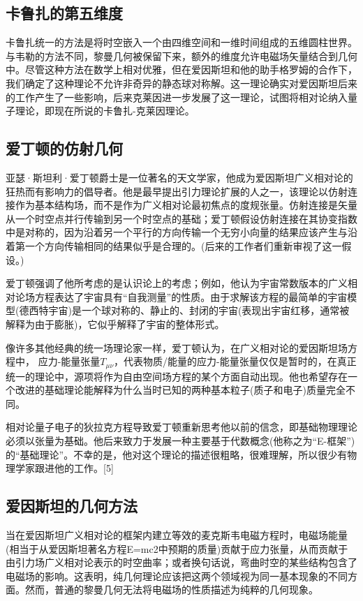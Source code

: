 \subsection{卡鲁扎的第五维度}

卡鲁扎统一的方法是将时空嵌入一个由四维空间和一维时间组成的五维圆柱世界。与韦勒的方法不同，黎曼几何被保留下来，额外的维度允许电磁场矢量结合到几何中。尽管这种方法在数学上相对优雅，但在爱因斯坦和他的助手格罗姆的合作下，我们确定了这种理论不允许非奇异的静态球对称解。这一理论确实对爱因斯坦后来的工作产生了一些影响，后来克莱因进一步发展了这一理论，试图将相对论纳入量子理论，即现在所说的卡鲁扎-克莱因理论。

\subsection{爱丁顿的仿射几何}

亚瑟·斯坦利·爱丁顿爵士是一位著名的天文学家，他成为爱因斯坦广义相对论的狂热而有影响力的倡导者。他是最早提出引力理论扩展的人之一，该理论以仿射连接作为基本结构场，而不是作为广义相对论最初焦点的度规张量。仿射连接是矢量从一个时空点并行传输到另一个时空点的基础；爱丁顿假设仿射连接在其协变指数中是对称的，因为沿着另一个平行的方向传输一个无穷小向量的结果应该产生与沿着第一个方向传输相同的结果似乎是合理的。(后来的工作者们重新审视了这一假设。)

爱丁顿强调了他所考虑的是认识论上的考虑；例如，他认为宇宙常数版本的广义相对论场方程表达了宇宙具有“自我测量”的性质。由于求解该方程的最简单的宇宙模型(德西特宇宙)是一个球对称的、静止的、封闭的宇宙(表现出宇宙红移，通常被解释为由于膨胀)，它似乎解释了宇宙的整体形式。

像许多其他经典的统一场理论家一样，爱丁顿认为，在广义相对论的爱因斯坦场方程中， 应力-能量张量$T_{\mu \nu}$，代表物质/能量的应力-能量张量仅仅是暂时的，在真正统一的理论中，源项将作为自由空间场方程的某个方面自动出现。他也希望存在一个改进的基础理论能解释为什么当时已知的两种基本粒子(质子和电子)质量完全不同。

相对论量子电子的狄拉克方程导致爱丁顿重新思考他以前的信念，即基础物理理论必须以张量为基础。他后来致力于发展一种主要基于代数概念(他称之为“E-框架”)的“基础理论”。不幸的是，他对这个理论的描述很粗略，很难理解，所以很少有物理学家跟进他的工作。[5]

\subsection{爱因斯坦的几何方法}

当在爱因斯坦广义相对论的框架内建立等效的麦克斯韦电磁方程时，电磁场能量(相当于从爱因斯坦著名方程E=mc2中预期的质量)贡献于应力张量，从而贡献于由引力场广义相对论表示的时空曲率；或者换句话说，弯曲时空的某些结构包含了电磁场的影响。这表明，纯几何理论应该把这两个领域视为同一基本现象的不同方面。然而，普通的黎曼几何无法将电磁场的性质描述为纯粹的几何现象。

